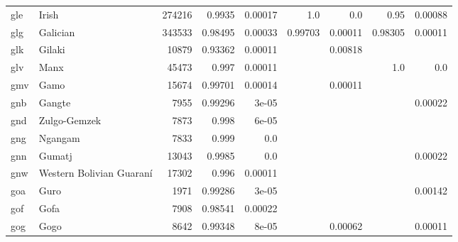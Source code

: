 \documentclass[11pt]{article}
\begin{document}
\begin{table*}[h]
{\begin{tabular}{llrrrrrrr}
gle         & Irish         & 274216         & 0.9935         & 0.00017         & 1.0         & 0.0         & 0.95         & 0.00088         \\

glg         & Galician         & 343533         & 0.98495         & 0.00033         & 0.99703         & 0.00011         & 0.98305         & 0.00011         \\

glk         & Gilaki         & 10879         & 0.93362         & 0.00011         &          & 0.00818         &          &          \\

glv         & Manx         & 45473         & 0.997         & 0.00011         &          &          & 1.0         & 0.0         \\

gmv         & Gamo         & 15674         & 0.99701         & 0.00014         &          & 0.00011         &          &          \\

gnb         & Gangte         & 7955         & 0.99296         & 3e-05         &          &          &          & 0.00022         \\

gnd         & Zulgo-Gemzek         & 7873         & 0.998         & 6e-05         &          &          &          &          \\

gng         & Ngangam         & 7833         & 0.999         & 0.0         &          &          &          &          \\

gnn         & Gumatj         & 13043         & 0.9985         & 0.0         &          &          &          & 0.00022         \\

gnw         & Western Bolivian Guaraní         & 17302         & 0.996         & 0.00011         &          &          &          &          \\

goa         & Guro         & 1971         & 0.99286         & 3e-05         &          &          &          & 0.00142         \\

gof         & Gofa         & 7908         & 0.98541         & 0.00022         &          &          &          &          \\

gog         & Gogo         & 8642         & 0.99348         & 8e-05         &          & 0.00062         &          & 0.00011         \\


\end{tabular}}
\end{table*}
\end{document}
